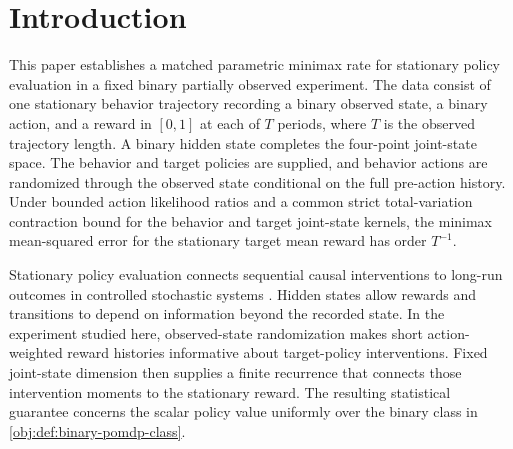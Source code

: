 \begin{abstract}
We characterize the minimax mean-squared error for stationary policy evaluation from one stationary behavior trajectory in a partially observed Markov decision process with binary observed states, binary hidden states, and binary actions. The behavior and target policies are known, actions are randomized conditional on the observed state, rewards lie in \([0,1]\), action likelihood ratios are bounded, and both policy-induced joint-state kernels satisfy a common strict total-variation contraction bound. At fixed mixing and action-overlap parameters, the minimax risk has order \(T^{-1}\), where \(T\) is the observed trajectory length. Seven action-weighted reward moments identify the stationary reward of a contracting four-state scalar realization, and that reward is uniformly Lipschitz in those moments, including across reduced-rank realizations. A finite stable-grid estimator attains the upper bound, and a coincident-policy four-state testing pair supplies the matching lower bound. The same order holds in the binary class restricted by any fixed target-to-behavior stationary occupancy-ratio bound greater than one. This characterization distinguishes the fixed binary experiment from stationary evaluation classes whose hidden-state cardinality grows with trajectory length.
\end{abstract}

\section{Introduction}

This paper establishes a matched parametric minimax rate for stationary policy evaluation in a fixed binary partially observed experiment. The data consist of one stationary behavior trajectory recording a binary observed state, a binary action, and a reward in \([0,1]\) at each of \(T\) periods, where \(T\) is the observed trajectory length. A binary hidden state completes the four-point joint-state space. The behavior and target policies are supplied, and behavior actions are randomized through the observed state conditional on the full pre-action history. Under bounded action likelihood ratios and a common strict total-variation contraction bound for the behavior and target joint-state kernels, the minimax mean-squared error for the stationary target mean reward has order \(T^{-1}\).

Stationary policy evaluation connects sequential causal interventions to long-run outcomes in controlled stochastic systems \citep{Robins1986,Murphy2003,Puterman1994}. Hidden states allow rewards and transitions to depend on information beyond the recorded state. In the experiment studied here, observed-state randomization makes short action-weighted reward histories informative about target-policy interventions. Fixed joint-state dimension then supplies a finite recurrence that connects those intervention moments to the stationary reward. The resulting statistical guarantee concerns the scalar policy value uniformly over the binary class in \cref{obj:def:binary-pomdp-class}.

